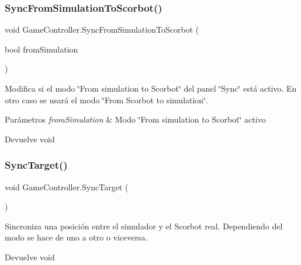\subsubsection{\texorpdfstring{SyncFromSimulationToScorbot()}{SyncFromSimulationToScorbot()}}
{\footnotesize\ttfamily void Game\+Controller.\+Sync\+From\+Simulation\+To\+Scorbot (\begin{DoxyParamCaption}\item[{bool}]{from\+Simulation }\end{DoxyParamCaption})\hspace{0.3cm}{\ttfamily [inline]}}

Modifica si el modo \char`\"{}\+From simulation to Scorbot\char`\"{} del panel \char`\"{}\+Sync\char`\"{} está activo. En otro caso se usará el modo \char`\"{}\+From Scorbot to simulation\char`\"{}. 
\begin{DoxyParams}{Parámetros}
{\em from\+Simulation} & Modo \char`\"{}\+From simulation to Scorbot\char`\"{} activo \\
\hline
\end{DoxyParams}
\begin{DoxyReturn}{Devuelve}
void 
\end{DoxyReturn}
\mbox{\label{class_game_controller_afb0be280e9e68853555db2ef42337bd9}} 
\subsubsection{\texorpdfstring{SyncTarget()}{SyncTarget()}}
{\footnotesize\ttfamily void Game\+Controller.\+Sync\+Target (\begin{DoxyParamCaption}{ }\end{DoxyParamCaption})\hspace{0.3cm}{\ttfamily [inline]}}

Sincroniza una posición entre el simulador y el Scorbot real. Dependiendo del modo se hace de uno a otro o viceversa. \begin{DoxyReturn}{Devuelve}
void 
\end{DoxyReturn}
\mbox{\label{class_game_controller_a6de8761e6cd2b07a857ea3ec0544fa40}} 

